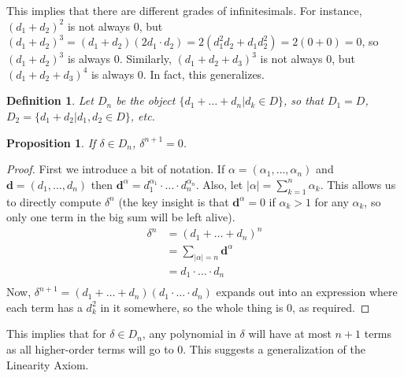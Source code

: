 \documentclass[]{book}
\newtheorem{prop}[thm]{Proposition}
\newtheorem{definition}{Definition}
\newcommand{\abs}[1]{\left\lvert #1 \right\rvert}
\begin{document}
This implies that there are different grades of infinitesimals. For instance, $(d_1+d_2)^2$ is not always 0, but $(d_1+d_2)^3 = (d_1+d_2)(2d_1 \cdot d_2) = 2(d_1^2d_2+d_1d_2^2) = 2(0 + 0) = 0$, so $(d_1+d_2)^3$ is always 0. Similarly, $(d_1+d_2+d_3)^3$ is not always 0, but $(d_1+d_2+d_3)^4$ is always 0. In fact, this generalizes.

\begin{definition}
  Let $D_n$ be the object $\{ d_1+\ldots+d_n | d_k \in D\}$, so that $D_1 = D$, $D_2 = \{ d_1 + d_2 | d_1,d_2 \in D \}$, etc.
\end{definition}

\begin{prop}
  If $\delta \in D_n$, $\delta^{n+1} = 0$.
\end{prop}
\begin{proof}
  First we introduce a bit of notation. If $\alpha = (\alpha_1,\ldots,\alpha_n)$ and $\mathbf{d} = (d_1,\ldots,d_n)$ then $\mathbf{d}^\alpha = d_1^{\alpha_1} \cdot \ldots \cdot d_n^{\alpha_n}$. Also, let $\abs{\alpha} = \sum_{k=1}^n\alpha_k$. This allows us to directly compute $\delta^n$ (the key insight is that $\mathbf{d}^\alpha = 0$ if $\alpha_k > 1$ for any $\alpha_k$, so only one term in the big sum will be left alive).
  \begin{align*}
    \delta^n &= (d_1 + \ldots + d_n)^n \\
                 &= \sum_{\abs{\alpha} = n}\mathbf{d}^\alpha \\
                 &= d_1 \cdot \ldots \cdot d_n \\
  \end{align*}
 Now, $\delta^{n+1} = (d_1 + \ldots + d_n)(d_1 \cdot \ldots \cdot d_n)$ expands out into an expression where each term has a $d_k^2$ in it somewhere, so the whole thing is 0, as required.
\end{proof}

This implies that for $\delta \in D_n$, any polynomial in $\delta$ will have at most $n+1$ terms as all higher-order terms will go to 0. This suggests a generalization of the Linearity Axiom.
\end{document}
